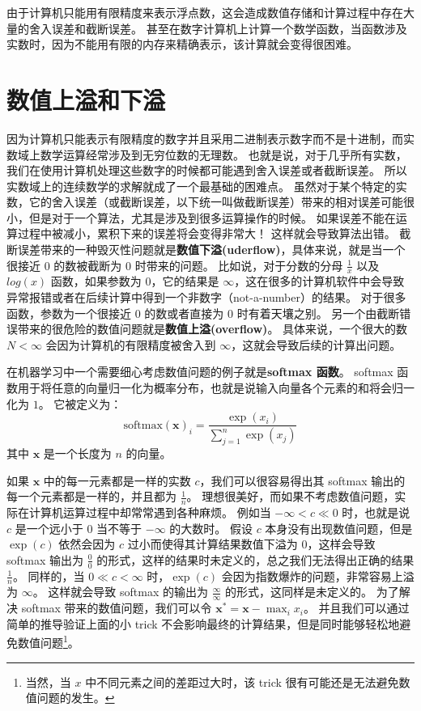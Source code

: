 由于计算机只能用有限精度来表示浮点数，这会造成数值存储和计算过程中存在大量的舍入误差和截断误差。
甚至在数字计算机上计算一个数学函数，当函数涉及实数时，因为不能用有限的内存来精确表示，该计算就会变得很困难。

\section{数值上溢和下溢}
因为计算机只能表示有限精度的数字并且采用二进制表示数字而不是十进制，而实数域上数学运算经常涉及到无穷位数的无理数。
也就是说，对于几乎所有实数，我们在使用计算机处理这些数字的时候都可能遇到舍入误差或者截断误差。
所以实数域上的连续数学的求解就成了一个最基础的困难点。
虽然对于某个特定的实数，它的舍入误差（或截断误差，以下统一叫做截断误差）带来的相对误差可能很小，但是对于一个算法，尤其是涉及到很多运算操作的时候。
如果误差不能在运算过程中被减小，累积下来的误差将会变得非常大！
这样就会导致算法出错。
截断误差带来的一种毁灭性问题就是\textbf{数值下溢(uderflow)}，具体来说，就是当一个很接近 $0$ 的数被截断为 $0$ 时带来的问题。
比如说，对于分数的分母 $\frac{1}{x}$ 以及 $log(x)$ 函数，如果参数为 $0$，它的结果是 $\infty$，这在很多的计算机软件中会导致异常报错或者在后续计算中得到一个非数字（not-a-number）的结果。
对于很多函数，参数为一个很接近 $0$ 的数或者直接为 $0$ 时有着天壤之别。
另一个由截断错误带来的很危险的数值问题就是\textbf{数值上溢(overflow)}。
具体来说，一个很大的数 $N < \infty$ 会因为计算机的有限精度被舍入到 $\infty$，这就会导致后续的计算出问题。

在机器学习中一个需要细心考虑数值问题的例子就是\textbf{softmax 函数}。
softmax 函数用于将任意的向量归一化为概率分布，也就是说输入向量各个元素的和将会归一化为 $1$。
它被定义为：
\begin{equation}
	\text{softmax}(\boldsymbol{x})_i = \frac{\exp(x_i)}{\sum_{j=1}^n\exp(x_j)}
\end{equation}
其中 $\boldsymbol{x}$ 是一个长度为 $n$ 的向量。

如果 $\boldsymbol{x}$ 中的每一元素都是一样的实数 $c$，我们可以很容易得出其 softmax 输出的每一个元素都是一样的，并且都为 $\frac{1}{n}$。
理想很美好，而如果不考虑数值问题，实际在计算机运算过程中却常常遇到各种麻烦。
例如当 $-\infty < c \ll 0$ 时，也就是说 $c$ 是一个远小于 $0$ 当不等于 $-\infty$ 的大数时。
假设 $c$ 本身没有出现数值问题，但是 $\exp(c)$ 依然会因为 $c$ 过小而使得其计算结果数值下溢为 $0$，这样会导致 softmax 输出为 $\frac{0}{0}$ 的形式，这样的结果时未定义的，总之我们无法得出正确的结果 $\frac{1}{n}$。
同样的，当 $0 \ll c < \infty$ 时，$\exp(c)$ 会因为指数爆炸的问题，非常容易上溢为 $\infty$。
这样就会导致 softmax 的输出为 $\frac{\infty}{\infty}$ 的形式，这同样是未定义的。
为了解决 softmax 带来的数值问题，我们可以令 $\boldsymbol{x}^* = \boldsymbol{x} - \max_i x_i$。
并且我们可以通过简单的推导验证上面的小 trick 不会影响最终的计算结果，但是同时能够轻松地避免数值问题\footnote{当然，当 $x$ 中不同元素之间的差距过大时，该 trick 很有可能还是无法避免数值问题的发生。}。

